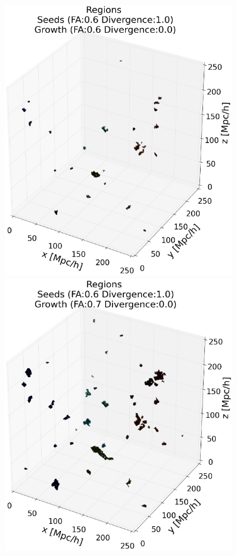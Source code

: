 \documentclass[12pt]{article}
\begin{document}
\begin{figure}[ht]
\centering
\begin{minipage}{.45\textwidth}
  \centering
  \includegraphics[width=0.9\textwidth]{groups/3d/seeds_FA_6/regions_nonoise_seeds_FA_06_Trace_10_search_FA_06_Trace_00_.png}
\end{minipage}%
\begin{minipage}{.45\textwidth}
  \centering
  \includegraphics[width=0.9\textwidth]{groups/3d/seeds_FA_6/regions_nonoise_seeds_FA_06_Trace_10_search_FA_07_Trace_00_.png}

\end{minipage}
\end{figure}
\end{document}

